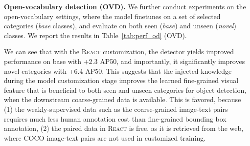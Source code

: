 \documentclass[10pt,twocolumn,letterpaper]{article}
\renewcommand{\paragraph}[1]{\vspace{1.25mm}\noindent\textbf{#1}}
\newcommand{\shortname}{\textsc{React}}
\begin{document}
\paragraph{Open-vocabulary detection (OVD).}
We further conduct experiments on the open-vocabulary settings, where the model finetunes on a set of selected categories (\emph{base} classes), and evaluate on both seen (\emph{base}) and unseen (\emph{novel}) classes.  We report the results in Table~\ref{tab:perf_od} (OVD).

We can see that with the \shortname{} customization, the detector yields improved performance on base with +2.3 AP50, and importantly, it significantly improves novel categories with +6.4 AP50.  This suggests that the injected knowledge during the model customization stage improves the learned fine-grained visual feature that is beneficial to both seen and unseen categories for object detection, when the downstream coarse-grained data is available. This is favored, because (1) the weakly-supervised data such as the coarse-grained image-text pairs requires much less human annotation cost than fine-grained bounding box annotation, (2) the paired data in \shortname{} is free, as it is retrieved from the web, where COCO image-text pairs are not used in customized training.
\end{document}
